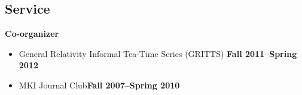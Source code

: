 \documentclass[margin,line]{res}
\begin{document}
\begin{resume}
\section{\sc Service}
{\bf Co-organizer}
\vspace*{.05in}
\begin{itemize}
\item[] General Relativity Informal Tea-Time Series (GRITTS)\hfill
  {\bf Fall 2011--Spring 2012}
\item[] MKI Journal Club\hfill {\bf Fall 2007--Spring 2010}
\end{itemize}

\end{resume}
\end{document}
